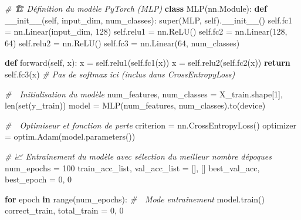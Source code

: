 \documentclass[
]{article}
\newenvironment{Shaded}{}{}
\newcommand{\BuiltInTok}[1]{\textcolor[rgb]{0.00,0.50,0.00}{#1}}
\newcommand{\CommentTok}[1]{\textcolor[rgb]{0.38,0.63,0.69}{\textit{#1}}}
\newcommand{\ControlFlowTok}[1]{\textcolor[rgb]{0.00,0.44,0.13}{\textbf{#1}}}
\newcommand{\DecValTok}[1]{\textcolor[rgb]{0.25,0.63,0.44}{#1}}
\newcommand{\FunctionTok}[1]{\textcolor[rgb]{0.02,0.16,0.49}{#1}}
\newcommand{\KeywordTok}[1]{\textcolor[rgb]{0.00,0.44,0.13}{\textbf{#1}}}
\newcommand{\NormalTok}[1]{#1}
\newcommand{\OperatorTok}[1]{\textcolor[rgb]{0.40,0.40,0.40}{#1}}
\newcommand{\VariableTok}[1]{\textcolor[rgb]{0.10,0.09,0.49}{#1}}
\begin{document}
\begin{Shaded}
\begin{Highlighting}[]
\CommentTok{\# 🏗 Définition du modèle PyTorch (MLP)}
\KeywordTok{class}\NormalTok{ MLP(nn.Module):}
    \KeywordTok{def} \FunctionTok{\_\_init\_\_}\NormalTok{(}\VariableTok{self}\NormalTok{, input\_dim, num\_classes):}
        \BuiltInTok{super}\NormalTok{(MLP, }\VariableTok{self}\NormalTok{).}\FunctionTok{\_\_init\_\_}\NormalTok{()}
        \VariableTok{self}\NormalTok{.fc1 }\OperatorTok{=}\NormalTok{ nn.Linear(input\_dim, }\DecValTok{128}\NormalTok{)}
        \VariableTok{self}\NormalTok{.relu1 }\OperatorTok{=}\NormalTok{ nn.ReLU()}
        \VariableTok{self}\NormalTok{.fc2 }\OperatorTok{=}\NormalTok{ nn.Linear(}\DecValTok{128}\NormalTok{, }\DecValTok{64}\NormalTok{)}
        \VariableTok{self}\NormalTok{.relu2 }\OperatorTok{=}\NormalTok{ nn.ReLU()}
        \VariableTok{self}\NormalTok{.fc3 }\OperatorTok{=}\NormalTok{ nn.Linear(}\DecValTok{64}\NormalTok{, num\_classes)}

    \KeywordTok{def}\NormalTok{ forward(}\VariableTok{self}\NormalTok{, x):}
\NormalTok{        x }\OperatorTok{=} \VariableTok{self}\NormalTok{.relu1(}\VariableTok{self}\NormalTok{.fc1(x))}
\NormalTok{        x }\OperatorTok{=} \VariableTok{self}\NormalTok{.relu2(}\VariableTok{self}\NormalTok{.fc2(x))}
        \ControlFlowTok{return} \VariableTok{self}\NormalTok{.fc3(x)  }\CommentTok{\# Pas de softmax ici (inclus dans CrossEntropyLoss)}

\CommentTok{\# 🎯 Initialisation du modèle}
\NormalTok{num\_features, num\_classes }\OperatorTok{=}\NormalTok{ X\_train.shape[}\DecValTok{1}\NormalTok{], }\BuiltInTok{len}\NormalTok{(}\BuiltInTok{set}\NormalTok{(y\_train))}
\NormalTok{model }\OperatorTok{=}\NormalTok{ MLP(num\_features, num\_classes).to(device)}

\CommentTok{\# 🚀 Optimiseur et fonction de perte}
\NormalTok{criterion }\OperatorTok{=}\NormalTok{ nn.CrossEntropyLoss()}
\NormalTok{optimizer }\OperatorTok{=}\NormalTok{ optim.Adam(model.parameters())}

\CommentTok{\# 📈 Entraînement du modèle avec sélection du meilleur nombre d\textquotesingle{}époques}
\NormalTok{num\_epochs }\OperatorTok{=} \DecValTok{100}
\NormalTok{train\_acc\_list, val\_acc\_list }\OperatorTok{=}\NormalTok{ [], []}
\NormalTok{best\_val\_acc, best\_epoch }\OperatorTok{=} \DecValTok{0}\NormalTok{, }\DecValTok{0}

\ControlFlowTok{for}\NormalTok{ epoch }\KeywordTok{in} \BuiltInTok{range}\NormalTok{(num\_epochs):}
    \CommentTok{\# 🔄 Mode entraînement}
\NormalTok{    model.train()}
\NormalTok{    correct\_train, total\_train }\OperatorTok{=} \DecValTok{0}\NormalTok{, }\DecValTok{0}


\end{Highlighting}
\end{Shaded}
\end{document}

